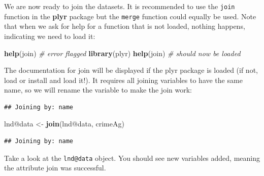 \documentclass[]{article}
\newenvironment{Shaded}{}{}
\newcommand{\KeywordTok}[1]{\textcolor[rgb]{0.00,0.44,0.13}{\textbf{{#1}}}}
\newcommand{\DataTypeTok}[1]{\textcolor[rgb]{0.56,0.13,0.00}{{#1}}}
\newcommand{\StringTok}[1]{\textcolor[rgb]{0.25,0.44,0.63}{{#1}}}
\newcommand{\CommentTok}[1]{\textcolor[rgb]{0.38,0.63,0.69}{\textit{{#1}}}}
\newcommand{\NormalTok}[1]{{#1}}
\begin{document}
We are now ready to join the datasets. It is recommended to use the
\texttt{join} function in the \textbf{plyr} package but the
\texttt{merge} function could equally be used. Note that when we ask for
help for a function that is not loaded, nothing happens, indicating we
need to load it:

\begin{Shaded}
\begin{Highlighting}[]
\KeywordTok{help}\NormalTok{(join)  }\CommentTok{# error flagged}
\KeywordTok{library}\NormalTok{(plyr)}
\KeywordTok{help}\NormalTok{(join)  }\CommentTok{# should now be loaded}
\end{Highlighting}
\end{Shaded}

The documentation for join will be displayed if the plyr package is
loaded (if not, load or install and load it!). It requires all joining
variables to have the same name, so we will rename the variable to make
the join work:

\begin{Shaded}
\end{Shaded}

\begin{verbatim}
## Joining by: name
\end{verbatim}

\begin{Shaded}
\begin{Highlighting}[]
\NormalTok{lnd@data <-}\StringTok{ }\KeywordTok{join}\NormalTok{(lnd@data, crimeAg)}
\end{Highlighting}
\end{Shaded}

\begin{verbatim}
## Joining by: name
\end{verbatim}

Take a look at the \texttt{lnd@data} object. You should see new
variables added, meaning the attribute join was successful.
\end{document}
